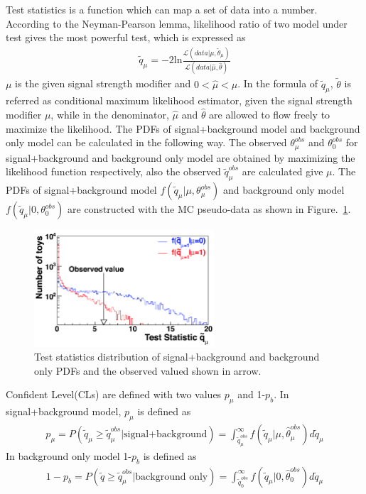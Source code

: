 Test statistics is a function which can map a set of data into a number. According to the Neyman-Pearson lemma, likelihood ratio of two model under test gives the most powerful test, which is expressed as
\begin{align*}
\tilde{q}_{\mu}=-2\textrm{ln}\frac{\mathcal{L}(data|\mu,\tilde{\theta}_{\mu})}{\mathcal{L}(data|\hat{\mu},\hat{\theta})}
\end{align*}
$\mu$ is the given signal strength modifier and $0<\hat{\mu}<\mu$. In the formula of $\tilde{q}_{\mu}$, $\tilde{\theta}$ is referred as conditional maximum likelihood estimator, given the signal strength modifier $\mu$, while in the denominator, $\hat{\mu}$ and $\hat{\theta}$ are allowed to flow freely to maximize the likelihood. The PDFs of signal+background model and background only model can be calculated in the following way. The observed $\theta^{obs}_{\mu}$ and  $\theta^{obs}_{0}$ for signal+background and background only model are obtained by maximizing the likelihood function respectively, also the observed $\tilde{q}_{\mu}^{obs}$ are calculated give $\mu$. The PDFs of signal+background model $f(\tilde{q}_{\mu}|\mu,\theta^{obs}_{\mu})$ and background only model $f(\tilde{q}_{\mu}|0,\theta^{obs}_{0})$ are constructed with the MC pseudo-data as shown in Figure.~\ref{fig:teststatistics}.

\begin{figure}[!tbp] 
\centering
\includegraphics[width=0.6\textwidth]{chapter7/Test_statistics.png}
\caption{Test statistics distribution of signal+background and background only PDFs and the observed valued shown in arrow.}
\label{fig:teststatistics}
\end{figure}
 
Confident Level(CLs) are defined with two values $p_{\mu}$ and 1-$p_{b}$. In signal+background model, $p_{\mu}$ is defined as
\begin{align*}
p_{\mu}=P(\tilde{q}_{\mu}\geq  \tilde{q}_{\mu}^{obs}  |\textrm{signal+background})=\int^{\infty}_{\tilde{q}_{\mu}^{obs}}f(\tilde{q}_{\mu}|\mu,\hat{\theta}_{\mu}^{obs})d \tilde{q}_{\mu}
\end{align*}
In background only model 1-$p_{b}$ is defined as
\begin{align*}
1-p_{b}=P(\tilde{q}\geq  \tilde{q}_{\mu}^{obs} | \textrm{background only})=\int^{\infty}_{\tilde{q}_{0}^{obs}}f(\tilde{q}_{\mu}|0,\hat{\theta}_{0}^{obs})d \tilde{q}_{\mu}
\end{align*}

